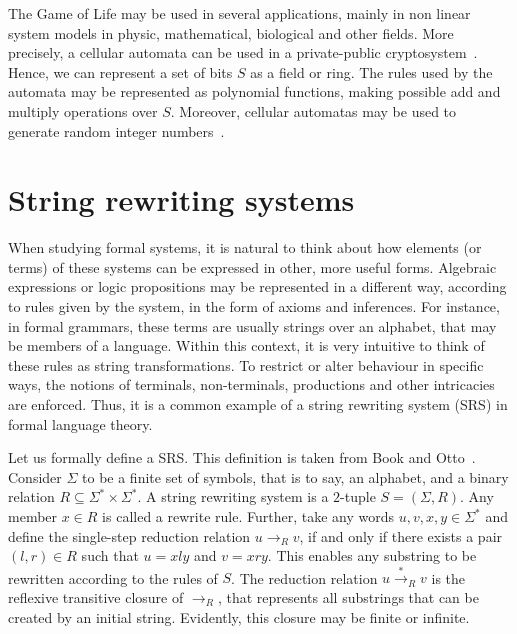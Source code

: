 \documentclass[12pt]{article}
\begin{document}
The Game of Life may be used in several applications, mainly in non linear system models in physic, mathematical, biological and other fields. More precisely, a cellular automata can be used in a private-public cryptosystem~\cite{Guan:article:1987:feb}. Hence, we can represent a set of bits $S$ as a field or ring. The rules used by the automata may be represented as polynomial functions, making possible add and multiply operations over $S$. Moreover, cellular automatas may be used to generate random integer numbers~\cite{Wolfram:article:1986:jun}.


\section{String rewriting systems}\label{sec:srs}

When studying formal systems, it is natural to think about how elements (or terms) of these systems can be expressed in other, more useful forms. Algebraic expressions or logic propositions may be represented in a different way, according to rules given by the system, in the form of axioms and inferences. For instance, in formal grammars, these terms are usually strings over an alphabet, that may be members of a language. Within this context, it is very intuitive to think of these rules as string transformations. To restrict or alter behaviour in specific ways, the notions of terminals, non-terminals, productions and other intricacies are enforced. Thus, it is a common example of a string rewriting system (SRS) in formal language theory.

Let us formally define a SRS. This definition is taken from Book and Otto~\cite[Sec. 2.1]{Book:book:1993}. Consider $\Sigma$ to be a finite set of symbols, that is to say, an alphabet, and a binary relation $R \subseteq \Sigma^{*} \times \Sigma^{*}$. A string rewriting system is a $2$-tuple $S = (\Sigma, R)$. Any member $x \in R$ is called a rewrite rule. Further, take any words $u, v, x, y \in \Sigma^{*}$ and define the single-step reduction relation $u \rightarrow_{R} v$, if and only if there exists a pair $(l, r) \in R$ such that $u = xly$ and $v = xry$. This enables any substring to be rewritten according to the rules of $S$. The reduction relation $u \stackrel{*}{\rightarrow}_{R} v$ is the reflexive transitive closure of $\rightarrow_{R}$, that represents all substrings that can be created by an initial string. Evidently, this closure may be finite or infinite.
\end{document}
